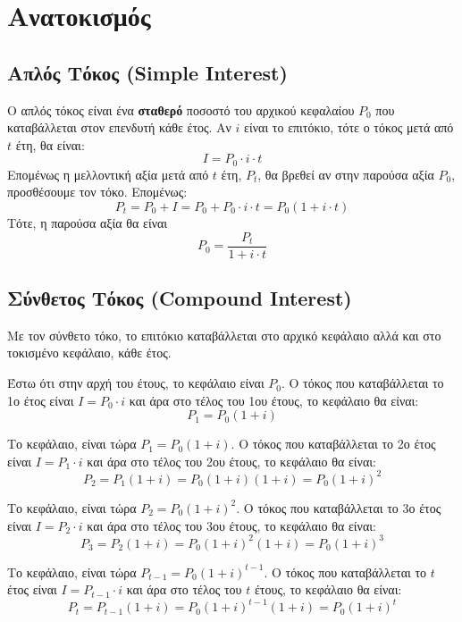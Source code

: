 



\everymath{\displaystyle}

\pagestyle{askhseis}




\chapter*{Ανατοκισμός}

\section*{Απλός Τόκος (Simple Interest)}

\begin{dfn}
  Ο \textcolor{Col1}{απλός τόκος} είναι ένα \textbf{σταθερό} ποσοστό του αρχικού 
  κεφαλαίου $ P_{0} $ που καταβάλλεται στον επενδυτή κάθε έτος. Αν $ i $ είναι το 
  επιτόκιο, τότε ο τόκος μετά από $t$ έτη, θα είναι:
  \[
    I=P_{0}\cdot i \cdot t 
  \] 
  Επομένως η μελλοντική αξία μετά από $t$ έτη, $ P_{t} $, θα βρεθεί αν στην παρούσα αξία
  $ P_{0} $, προσθέσουμε τον τόκο. Επομένως:
  \[
    P_{t} = P_{0} + I = P_{0} + P_{0}\cdot i\cdot t = P_{0}(1+i\cdot t)
  \] 
  Τότε, η παρούσα αξία θα είναι
  \[
    P_{0} = \frac{P_{t}}{1+ i \cdot t }  
  \] 
\end{dfn}



\section*{Σύνθετος Τόκος (Compound Interest)}

Με τον σύνθετο τόκο, το επιτόκιο καταβάλλεται στο αρχικό κεφάλαιο αλλά και στο 
τοκισμένο κεφάλαιο, κάθε έτος. 
\begin{description}[widest=3ο Έτος,labelsep*=1ex,leftmargin=*]
  \item[1ο Έτος:] Έστω ότι στην αρχή του έτους, το κεφάλαιο είναι $ P_{0} $. Ο τόκος 
    που καταβάλλεται το 1ο έτος είναι $ I = P_{0} \cdot i $ και άρα στο τέλος του 
    1ου έτους, το κεφάλαιο θα είναι:
    \[
      P_{1} = P_{0} (1+i)  
    \] 
  \item [2ο Έτος:] Το κεφάλαιο, είναι τώρα $ P_{1}=P_{0}(1+i) $. Ο τόκος που 
    καταβάλλεται το 2ο έτος είναι $ I = P_{1}\cdot i $ και άρα στο τέλος του 
    2ου έτους, το κεφάλαιο θα είναι:
    \[
      P_{2} = P_{1}(1+i) = P_{0}(1+i)(1+i) = P_{0} (1+i)^{2} 
    \] 
  \item [3ο Έτος:] Το κεφάλαιο, είναι τώρα $ P_{2}=P_{0}(1+i)^{2} $. Ο τόκος που 
    καταβάλλεται το 3ο έτος είναι $ I = P_{2}\cdot i $ και άρα στο τέλος του 
    3ου έτους, το κεφάλαιο θα είναι:
    \[
      P_{3} = P_{2}(1+i) = P_{0}(1+i)^{2}(1+i) = P_{0} (1+i)^{3} 
    \] 
  \item [$t$ Έτος:] Το κεφάλαιο, είναι τώρα $ P_{t-1}=P_{0}(1+i)^{t-1} $. Ο τόκος που 
    καταβάλλεται το $t$ έτος είναι $ I = P_{t-1}\cdot i $ και άρα στο τέλος του 
    $t$ έτους, το κεφάλαιο θα είναι:
    \[
      P_{t} = P_{t-1}(1+i) = P_{0}(1+i)^{t-1}(1+i) = P_{0} (1+i)^{t} 
    \] 
\end{description}

